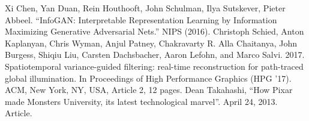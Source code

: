\documentclass[conference]{IEEEtran}
\begin{document}
\begin{thebibliography}{12}
 Xi Chen, Yan Duan, Rein Houthooft, John Schulman, Ilya Sutskever, Pieter Abbeel. ``InfoGAN: Interpretable Representation Learning by Information Maximizing Generative Adversarial Nets.'' NIPS (2016).
 Christoph Schied, Anton Kaplanyan, Chris Wyman, Anjul Patney, Chakravarty R. Alla Chaitanya, John Burgess, Shiqiu Liu, Carsten Dachsbacher, Aaron Lefohn, and Marco Salvi. 2017. Spatiotemporal variance-guided filtering: real-time reconstruction for path-traced global illumination. In Proceedings of High Performance Graphics (HPG '17). ACM, New York, NY, USA, Article 2, 12 pages.
 Dean Takahashi, ``How Pixar made Monsters University, its
latest technological marvel''. April 24, 2013. Article.
\end{thebibliography}
\end{document}
